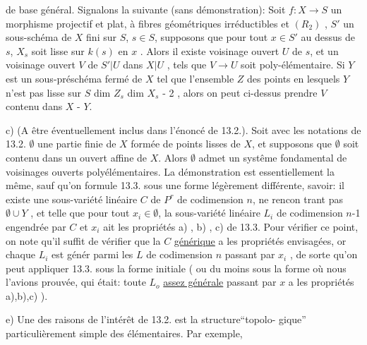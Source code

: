 
de base général. Signalons la suivante (sans démonstration): Soit $f:X\to S$
un morphisme projectif et plat,  à fibres géométriques
 irréductibles et $(R_2)$ , $S'$ un sous-schéma de $X$ fini sur $S$,
$s\in S$, supposons que pour tout $x\in S'$ au dessus de $s$, $X_s$ soit lisse sur
$k(s)$ en $x$ . Alors il existe  voisinage ouvert $U$ de $s$, et un voisinage
ouvert $V$ de $S'|U$ dans $X|U$ , tels que $V\longrightarrow U$ soit poly-élémentaire.
Si $Y$ est un sous-préschéma fermé de $X$ tel que l'ensemble $Z$ des points
en lesquels $Y$ n'est pas lisse sur $S$   
dim $Z_s$ \hand{$\leq$} dim $X_s$ - 2 , alors on peut ci-dessus prendre $V$ contenu dans
$X$ - $Y$.

c) (A être éventuellement inclus dans l'énoncé de 13.2.). Soit
avec les notations de 13.2. $\emptyset$ une partie finie de $X$ formée de points
lisses de $X$, et supposons que $\emptyset$ soit contenu dans un  ouvert affine
de $X$. Alors $\emptyset$ admet un systême fondamental de voisinages ouverts
polyélémentaires.  La démonstration est essentiellement la même, sauf
qu'on formule 13.3. sous une forme légèrement différente, savoir: il
existe une sous-variété linéaire $C$ de $P^r$ de codimension $n$, ne rencon%
trant pas $\emptyset\cup Y$ , et telle que pour tout $x_i\in\emptyset$, la sous-variété
linéaire $L_i$ de codimension $n$-1 engendrée par $C$ et $x_i$ ait les propriétés
a) , b) , c) de 13.3. Pour vérifier ce point, on note qu'il suffit de
vérifier que la $C$ \uline{générique} a les propriétés envisagées, or  
\hand{\unsure{,}} chaque $L_i$ est génér parmi les $L$ de codimension $n$ passant
par $x_i$ , de sorte qu'on peut appliquer 13.3. sous la forme initiale
( ou du moins sous la forme où nous l'avions prouvée, qui était: toute
$L_o$ \uline{assez générale} passant par $x$ a les propriétés a),b),c) ).

e) Une des raisons de l'intérêt de 13.2. est la structure``topolo-%
gique'' particulièrement simple des   élémentaires. Par exemple,


